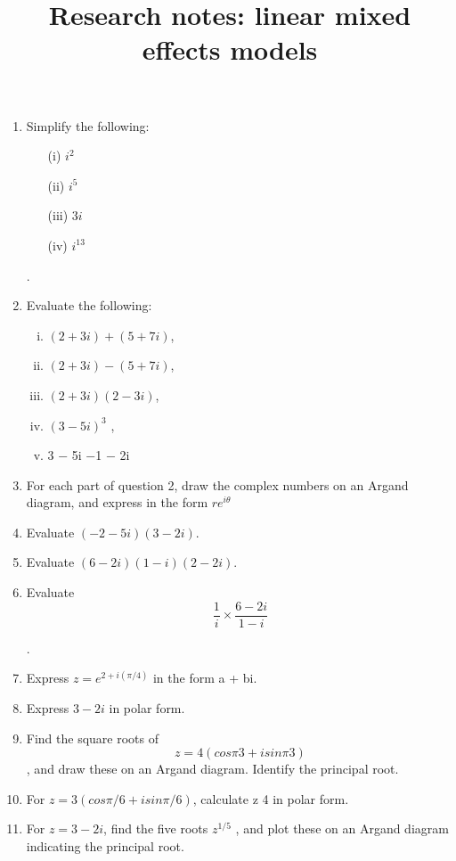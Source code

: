 \documentclass[12pt, a4paper]{report}
\title{Research notes: linear mixed effects models}
\author{ } \date{ }
\theoremstyle{plain}
\theoremstyle{definition}
\theoremstyle{remark}
\begin{document}
\begin{enumerate}
\item Simplify the following:
\begin{multicols}{2}
\begin{itemize}
	\item[(i)]  $i^2$
	\item[(ii)]  $i^5$
	\item[(iii)]  $3i$
	\item[(iv)]  $i^13$
\end{itemize}

\end{multicols}

.
\item Evaluate the following:
\begin{multicols}{2}
\begin{enumerate}[(i)]
	\item $(2 + 3i) + (5 + 7i)$,
	\item $(2 + 3i) − (5 + 7i)$,
	\item $(2 + 3i)(2 − 3i)$,
	\item $(3 − 5i)^3$
	,
	\item 3 − 5i
	−1 − 2i
	
\end{enumerate}
\end{multicols}


\item For each part of question 2, draw the complex numbers on an Argand diagram, and express in
the form $re^{iθ}$

\item Evaluate $(-2 - 5i)(3- 2i)$.
\item Evaluate $(6 - 2i)(1 - i)(2 - 2i)$.
\item Evaluate 
\[ \frac{1}{i} \times \frac{6-2i}{1-i}\]


.
\item Express $z = e^{2+i(\pi/4)}$ in the form a + bi.
\item Express $3 - 2i$ in polar form.
\item Find the square roots of \[z = 4(cos π
3 + isin π
3
)\], and draw these on an Argand diagram. Identify
the principal root.
\item For $z = 3(cos \pi/6 + isin \pi/6)$, calculate z
4
in polar form.
\item For $z = 3 - 2i$, find the five roots $z^{1/5}$
, and plot these on an Argand diagram indicating the
principal root.



\end{enumerate}
\end{document}
